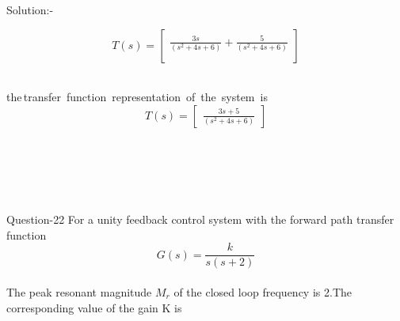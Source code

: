 \documentclass[journal,12pt,twocolumn]{IEEEtran}
\begin{document}
\begin{frame}{Solution:- }
\begin{frame}{}
\begin{frame}{}
\end{frame}
\begin{frame}{}
\[
 T(s) = \left[ {\begin{array}{cc}
   \frac{3s}{(s^2 + 4s + 6)} + \frac{5}{(s^2 + 4s + 6)} \\

  \end{array} } \right]
\]\\
\vskip 0.1cm

 the\,transfer\, function\, representation\, of\, the\, system\, is 
\vskip 0.5cm
\\
\[  T(s) = \left[ {\begin{array}{cc}
   \frac{3s + 5}{(s^2 + 4s + 6)} 
  \end{array} } \right]
\]
\end{frame}
\\\\\\\\
\begin{frame}{Question-22 }
For a unity feedback control system with the forward path transfer function
    $${G(s)} = \frac{k}{s(s+2)}$$
\\The peak resonant magnitude $M_{r}$ of the closed loop frequency is 2.The corresponding value of the gain K is


\end{frame}
\end{frame}
\end{frame}
\end{document}
